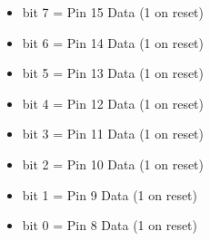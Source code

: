 \begin{itemize}
\item bit 7 = Pin 15 Data (1 on reset)
\item bit 6 = Pin 14 Data (1 on reset)
\item bit 5 = Pin 13 Data (1 on reset)
\item bit 4 = Pin 12 Data (1 on reset)
\item bit 3 = Pin 11 Data (1 on reset)
\item bit 2 = Pin 10 Data (1 on reset)
\item bit 1 = Pin 9 Data (1 on reset)
\item bit 0 = Pin 8 Data (1 on reset)
\end{itemize}

